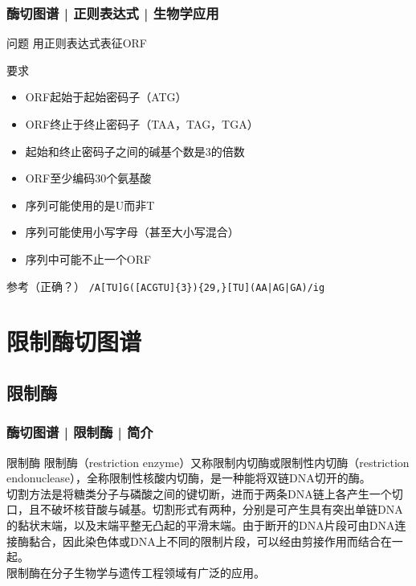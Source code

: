 \begin{frame}[fragile]
  \frametitle{酶切图谱 | 正则表达式 | 生物学应用}
  \begin{block}{问题}
    用正则表达式表征ORF
  \end{block}
  \pause
  \begin{block}{要求}
    \begin{itemize}
      \item ORF起始于起始密码子（ATG）
      \item ORF终止于终止密码子（TAA，TAG，TGA）
      \item 起始和终止密码子之间的碱基个数是3的倍数
      \item ORF至少编码30个氨基酸
      \item 序列可能使用的是U而非T
      \item 序列可能使用小写字母（甚至大小写混合）
      \item 序列中可能不止一个ORF
    \end{itemize}
  \end{block}
  \pause
  \begin{block}{参考\alert{（正确？）}}
    \verb=/A[TU]G([ACGTU]{3}){29,}[TU](AA|AG|GA)/ig=
  \end{block}
\end{frame}

\section{限制酶切图谱}
\subsection{限制酶}
\begin{frame}
  \frametitle{酶切图谱 | 限制酶 | 简介}
  \begin{block}{限制酶}
    限制酶（restriction enzyme）又称限制内切酶或限制性内切酶（restriction endonuclease），全称限制性核酸内切酶，是一种能将双链DNA切开的酶。\\
    \vspace{1em}
切割方法是将糖类分子与磷酸之间的键切断，进而于两条DNA链上各产生一个切口，且不破坏核苷酸与碱基。切割形式有两种，分别是可产生具有突出单链DNA的黏状末端，以及末端平整无凸起的平滑末端。由于断开的DNA片段可由DNA连接酶黏合，因此染色体或DNA上不同的限制片段，可以经由剪接作用而结合在一起。\\
    \vspace{1em}
    限制酶在分子生物学与遗传工程领域有广泛的应用。
  \end{block}
\end{frame}


